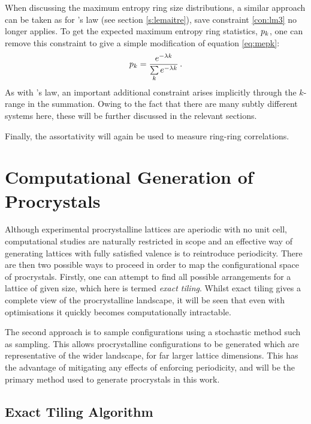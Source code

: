 When discussing the maximum entropy ring size distributions, a similar approach can be taken as for \lm's law (see section \ref{s:lemaitre}), save constraint \eqref{con:lm3} no longer applies.
To get the expected maximum entropy ring statistics, $p_k$, one can remove this constraint to give a simple modification of equation \eqref{eq:mepk}:
\begin{equation}
	\label{eq:prome}
    p_k = \frac{e^{-\lambda k}}{\sum\limits_k e^{-\lambda k}}\,.
\end{equation}
As with \lm's law, an important additional constraint arises implicitly through the $k$\--range in the summation.
Owing to the fact that there are many subtly different systems here, these will be further discussed in the relevant sections.

Finally, the assortativity will again be used to measure ring\--ring correlations.

\section{Computational Generation of Procrystals}

Although experimental procrystalline lattices are aperiodic with no unit cell, computational studies are naturally restricted in scope and an effective way of generating lattices with fully satisfied valence is to reintroduce periodicity. 
There are then two possible ways to proceed in order to map the configurational space of procrystals.
Firstly, one can attempt to find all possible arrangements for a lattice of given size, which here is termed \textit{exact tiling}.
Whilst exact tiling gives a complete view of the procrystalline landscape, it will be seen that even with optimisations it quickly becomes computationally intractable.

The second approach is to sample configurations using a stochastic method such as \mc{} sampling.
This allows procrystalline configurations to be generated which are representative of the wider landscape, for far larger lattice dimensions.
This has the advantage of mitigating any effects of enforcing periodicity, and will be the primary method used to generate procrystals in this work.

\subsection{Exact Tiling Algorithm}

